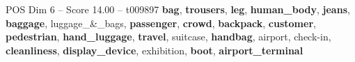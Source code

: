 \begin{textsample}{POS Dim 6 – Score 14.00 – t009897}  \label{ex:f6_pos_008}
\textbf{bag}, \textbf{trousers}, \textbf{leg}, \textbf{human\_body}, \textbf{jeans}, \textbf{baggage}, luggage\_\&\_bags, \textbf{passenger}, \textbf{crowd}, \textbf{backpack}, \textbf{customer}, \textbf{pedestrian}, \textbf{hand\_luggage}, \textbf{travel}, suitcase, \textbf{handbag}, airport, check-in, \textbf{cleanliness}, \textbf{display\_device}, exhibition, \textbf{boot}, \textbf{airport\_terminal}

\end{textsample}
